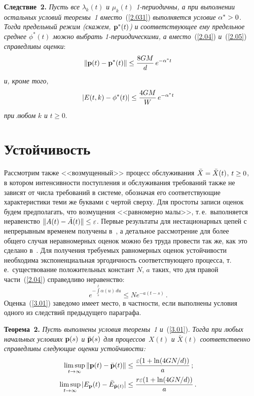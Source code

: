 \begin{multicols}{2}
\noindent
\textbf{Следствие~2.} \textit{Пусть все $\lambda_k(t)$ и $\mu_k(t)$ 1-пе\-ри\-одич\-ны,  
а при выполнении остальных условий теоремы~1 вместо}~(\ref{2.031}) 
\textit{выполняется условие  $\alpha^* \hm> 0$.  Тогда предельный режим (скажем, ${\mathbf p}^*(t)$) 
и соответствующее ему предельное среднее $\phi^*(t)$ можно выбрать 
1-пе\-ри\-оди\-че\-ски\-ми, а вместо}~(\ref{2.04}) \textit{и}~(\ref{2.05}) 
\textit{справедливы оценки}:
\begin{equation*} 
\|{\mathbf p}(t) - {\mathbf p}^*(t)\| \le \displaystyle\frac{\displaystyle 8GM\mathstrut}{\displaystyle d\mathstrut}\,e^{-\alpha^*t}
\end{equation*}
\textit{и, кроме того,}
\begin{equation*}
|E(t,k)-\phi^*(t)|\le \displaystyle\frac{\displaystyle 4GM\mathstrut}{\displaystyle W\mathstrut}\,e^{-\alpha^*t}
\end{equation*}
\textit{при любом $k$ и $t \ge 0$}.



\section{Устойчивость}

Рассмотрим также <<возмущенный>> процесс обслуживания $\bar{X}\hm=\bar{X}(t)$, $t\hm\geq 0$, 
в котором интенсивности поступления и обслуживания требований также не зависят от чис\-ла 
требований в системе, обозначая его соответствующие характеристики теми же буквами с 
чертой сверху. Для прос\-то\-ты записи оценок будем предполагать, что возмущения 
<<равномерно малы>>, т.\,е.\ выполняется неравенство $\| A(t)-\bar{A}(t)\| \hm\le \varepsilon$. 
Первые результаты для нестационарных цепей с непрерывным временем получены в~\cite{z85}, 
а детальное рассмотрение для более общего случая неравномерных оценок можно без труда 
провести так же, как это сделано в~\cite{z98, ae}. Для получения требуемых равномерных 
оценок устойчивости необходима экспоненциальная эргодичность соответствующего процесса, 
т.\,е.\ существование положительных констант $N$, $a$ таких, что  для правой части~(\ref{2.04}) 
справедливо неравенство:
\begin{equation}
e^{-\int\limits_s^t {\alpha(u)\,du}} \le Ne^{-a\left(t-s\right)}\,.
\label{3.01}
\end{equation}
Оценка~(\ref{3.01}) заведомо имеет место, в частности, если выполнены условия одного из следствий 
предыду\-ще\-го параграфа.

\smallskip

\noindent
\textbf{Теорема~2.}
\textit{Пусть выполнены условия теоремы~1 и}~(\ref{3.01}). \textit{Тогда при
 любых начальных условиях ${\bf p}(s)$ и ${\bar{\bf p}}(s)$ для процессов~$X(t)$ 
 и $\bar{X}(t)$ соответственно справедливы следующие оценки устойчивости:}
\begin{align*} 
\limsup_{t \to \infty}  \|{\bf p}(t)- \bar{\bf p}(t)\| &\le
\displaystyle\frac{\displaystyle \varepsilon(1+\ln(4GN/d))\mathstrut}{\displaystyle a\mathstrut}\,;
\\
\limsup\limits_{t \to \infty}   |E_{\bf p}(t)- \bar{E}_{\bar{\bf p}(t)}|&\le 
\displaystyle\frac{\displaystyle r \varepsilon(1+\ln(4GN/d))\mathstrut}{\displaystyle a\mathstrut}\,.
\end{align*}



\end{multicols}
